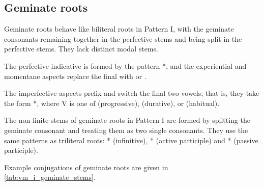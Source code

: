 \documentclass[grammar]{subfiles}
\begin{document}
\subsection{Geminate roots}
\label{ssec:vm_i_geminate_roots}

Geminate roots behave like biliteral roots in Pattern I, with the geminate
consonants remaining together in the perfective stems and being split in the
perfective stems.  They lack distinct modal stems. 

The perfective indicative is formed by the pattern *, and the
experiential and momentane aspects replace the final  with  or
.

The imperfective aspects prefix  and switch the final two vowels; that
is, they take the form *, where V is one of 
(progressive),  (durative), or  (habitual).


The non-finite stems of geminate roots in Pattern I are formed by splitting the
geminate consonant and treating them as two single consonants.  They use the
same patterns as triliteral roots:  * (infinitive), *
(active participle) and * (passive participle). 

Example conjugations of geminate roots are given in
\cref{tab:vm_i_geminate_stems}.


\begin{table}[h!]\small\capstart
  \centering
  \\
  \caption{Pattern I geminate stems \label{tab:vm_i_geminate_stems}}
\end{table}
\end{document}
